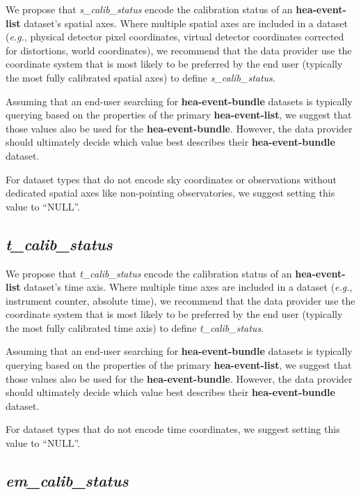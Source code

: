\documentclass[11pt,a4paper]{ivoa}
\begin{document}
We propose that {\em s\_calib\_status\/} encode the calibration status of an {\bf hea-event-list} dataset's spatial axes. Where multiple spatial axes are included in a dataset ({\em e.g.\/}, physical detector pixel coordinates, virtual detector coordinates corrected for distortions, world coordinates), we recommend that the data provider use the coordinate system that is most likely to be preferred by the end user (typically the most fully calibrated spatial axes) to define {\em s\_calib\_status\/}.

Assuming that an end-user searching for {\bf hea-event-bundle} datasets is typically querying based on the properties of the primary {\bf hea-event-list}, we suggest that those values also be used for the {\bf hea-event-bundle}.  However, the data provider should ultimately decide which value best describes their {\bf hea-event-bundle} dataset.

For dataset types that do not encode sky coordinates or observations without dedicated spatial axes like non-pointing observatories, we suggest setting this value to ``NULL''.

\subsection{{\em t\_calib\_status}}

We propose that {\em t\_calib\_status\/} encode the calibration status of an {\bf hea-event-list} dataset's time axis.  Where multiple time axes are included in a dataset ({\em e.g.\/}, instrument counter, absolute time), we recommend that the data provider use the coordinate system that is most likely to be preferred by the end user (typically the most fully calibrated time axis) to define {\em t\_calib\_sta\-tus\/}.

Assuming that an end-user searching for {\bf hea-event-bundle} datasets is typically querying based on the properties of the primary {\bf hea-event-list}, we suggest that those values also be used for the {\bf hea-event-bundle}.  However, the data provider should ultimately decide which value best describes their {\bf hea-event-bundle} dataset.

For dataset types that do not encode time coordinates, we suggest setting this value to ``NULL''.

\subsection{{\em em\_calib\_status}}
\end{document}
